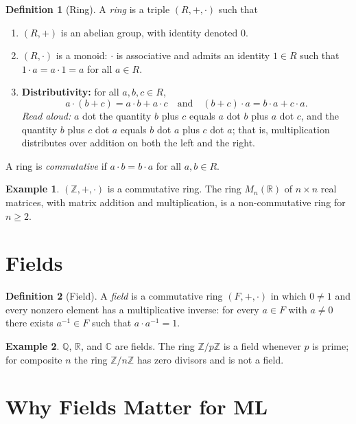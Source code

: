 \documentclass[11pt]{article}
\theoremstyle{definition}
\newtheorem{definition}{Definition}
\newtheorem{example}{Example}
\begin{document}
\begin{definition}[Ring]
A \emph{ring} is a triple $(R, +, \cdot)$ such that
\begin{enumerate}
  \item $(R, +)$ is an abelian group, with identity denoted $0$.
  \item $(R, \cdot)$ is a monoid: $\cdot$ is associative and admits an
        identity $1 \in R$ such that $1 \cdot a = a \cdot 1 = a$ for all
        $a \in R$.
  \item \textbf{Distributivity:} for all $a, b, c \in R$,
        \[
          a \cdot (b + c) = a \cdot b + a \cdot c
          \quad \text{and} \quad
          (b + c) \cdot a = b \cdot a + c \cdot a.
        \]
        \emph{Read aloud:} $a$ dot the quantity $b$ plus $c$ equals $a$ dot
        $b$ plus $a$ dot $c$, and the quantity $b$ plus $c$ dot $a$ equals $b$
        dot $a$ plus $c$ dot $a$; that is, multiplication distributes over
        addition on both the left and the right.
\end{enumerate}
A ring is \emph{commutative} if $a \cdot b = b \cdot a$ for all $a, b \in R$.
\end{definition}

\begin{example}
$(\mathbb{Z}, +, \cdot)$ is a commutative ring. The ring $M_n(\mathbb{R})$ of
$n \times n$ real matrices, with matrix addition and multiplication, is a
non-commutative ring for $n \ge 2$.
\end{example}

\section{Fields}

\begin{definition}[Field]
A \emph{field} is a commutative ring $(F, +, \cdot)$ in which $0 \neq 1$ and
every nonzero element has a multiplicative inverse: for every $a \in F$ with
$a \neq 0$ there exists $a^{-1} \in F$ such that $a \cdot a^{-1} = 1$.
\end{definition}

\begin{example}
$\mathbb{Q}$, $\mathbb{R}$, and $\mathbb{C}$ are fields. The ring
$\mathbb{Z}/p\mathbb{Z}$ is a field whenever $p$ is prime; for composite $n$
the ring $\mathbb{Z}/n\mathbb{Z}$ has zero divisors and is not a field.
\end{example}

\section{Why Fields Matter for ML}
\end{document}
